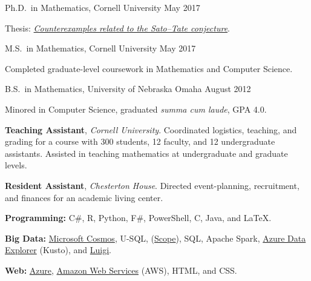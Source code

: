 \documentclass[11pt, letterpaper]{awesome-cv}
\begin{document}
\begin{cventries}

\cventry
  {Ph.D.~in Mathematics, Cornell University}
  {}{}
  {May 2017}
  {
    \begin{cvitems}
      \item{Thesis: \href{http://doi.org/10.7298/X4PN93Q3}{\emph{Counterexamples related to the Sato--Tate conjecture}}.}
    \end{cvitems}
  }
  
\cventry
  {M.S.~in Mathematics, Cornell University}
  {}{}
  {May 2017}
  {
    \begin{cvitems}
      \item{Completed graduate-level coursework in Mathematics and Computer Science.}
    \end{cvitems}
  }
  
\cventry
  {B.S.~in Mathematics, University of Nebraska Omaha}
  {}{}
  {August 2012}
  {
    \begin{cvitems}
      \item{Minored in Computer Science, graduated \emph{summa cum laude}, GPA 4.0.}
    \end{cvitems}
  }
  
\end{cventries}






\begin{cvparagraph}
\textbf{Teaching Assistant}, \emph{Cornell University}. Coordinated logistics, teaching, and grading for a course with 300 students, 12 faculty, and 12 undergraduate assistants.
Assisted in teaching mathematics at undergraduate and graduate levels.

\textbf{Resident Assistant}, \emph{Chesterton House}. Directed event-planning, recruitment, and finances for an academic living center. 
\end{cvparagraph}






\begin{cvparagraph}
\textbf{Programming:} C\#, R, Python, F\#, PowerShell, C, Java, and \LaTeX.

\textbf{Big Data:}
\href{https://docs.microsoft.com/en-us/azure/cosmos-db/introduction}{Microsoft Cosmos}, 
U-SQL, 
(\href{https://doi.org/10.14778/1454159.1454166}{Scope}),
SQL,
Apache Spark,
\href{https://docs.microsoft.com/en-us/azure/kusto/query/index}{Azure Data Explorer} (Kusto),
and 
\href{https://github.com/spotify/luigi}{Luigi}.

\textbf{Web:} 
\href{https://azure.microsoft.com/}{Azure}, 
\href{https://aws.amazon.com/}{Amazon Web Services} (AWS), 
HTML, and CSS.
\end{cvparagraph}
\end{document}
